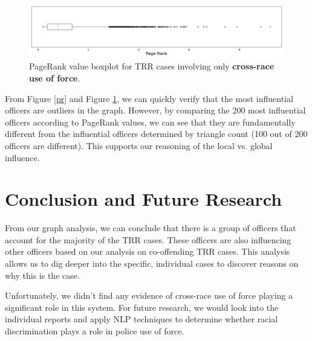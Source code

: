 \documentclass[10pt]{article}
\begin{document}
\begin{figure}[H]
\centering
\includegraphics[width=\textwidth]{pr_cross_race}
\caption{PageRank value boxplot for TRR cases involving only \textbf{cross-race use of force}.}
\label{pr_cross_race}
\end{figure}

From Figure \ref{pr} and Figure \ref{pr_cross_race}, we can quickly verify that the most influential officers are outliers in the graph. However, by comparing the 200 most influential officers according to PageRank values, we can see that they are fundamentally different from the influential officers determined by triangle count (100 out of 200 officers are different). This supports our reasoning of the local vs. global influence.


\section{Conclusion and Future Research}

From our graph analysis, we can conclude that there is a group of officers that account for the majority of the TRR cases. These officers are also influencing other officers based on our analysis on co-offending TRR cases. This analysis allows us to dig deeper into the specific, individual cases to discover reasons on why this is the case.

Unfortunately, we didn’t find any evidence of cross-race use of force playing a significant role in this system. For future research, we would look into the individual reports and apply NLP techniques to determine whether racial discrimination plays a role in police use of force.
\end{document}
